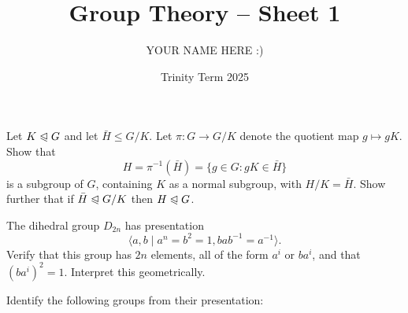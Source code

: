 \documentclass[answers]{exam}
\title{Group Theory -- Sheet 1}
\author{YOUR NAME HERE :)}
\date{Trinity Term 2025}
\let\nsg\trianglelefteqslant%
\begin{document}
\maketitle
\begin{questions}

\question%
Let $K \nsg G$ and let $\bar{H} \leqslant G / K$. Let $\pi: G \to G / K$ denote the quotient map $g \mapsto g K$. Show that \[
	H=\pi^{-1}(\bar{H})=\{g \in G: g K \in \bar{H}\}
\] is a subgroup of $G$, containing $K$ as a normal subgroup, with $H / K=\bar{H}$. Show further that if $\bar{H} \nsg G / K$ then $H \nsg G$.



\question%
The dihedral group $D_{2 n}$ has presentation \[
	\langle a, b \mid a^n=b^2=1, b a b^{-1}=a^{-1}\rangle.
\] Verify that this group has $2 n$ elements, all of the form $a^i$ or $b a^i$, and that $(b a^i)^2=1$. Interpret this geometrically.



\question%
Identify the following groups from their presentation:




\end{questions}
\end{document}
